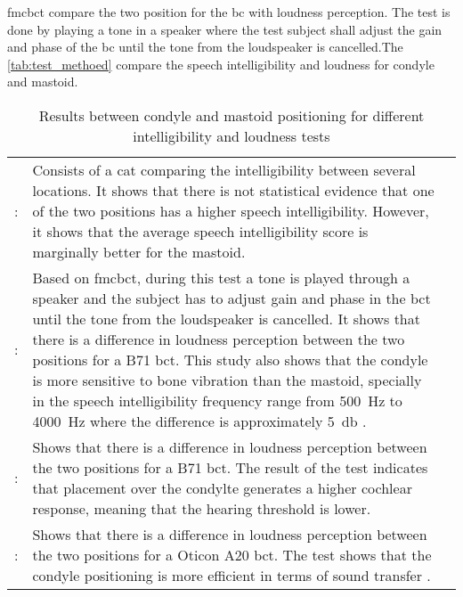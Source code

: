\gls{fmcbct} \citep{freefield_method} compare the two position for the \gls{bc} with loudness perception. The test is done by playing a tone in a speaker where the test subject shall adjust the gain and phase of the \gls{bc} until the tone from the loudspeaker is cancelled.The \autoref{tab:test_methoed} compare the speech intelligibility and loudness for condyle and mastoid.
 
\begin{table}[H]
\caption{Results between condyle and mastoid positioning for different intelligibility and loudness tests} 
\begin{tabularx}{\textwidth}{l X l}
\hline
\citep{cat_test}: & Consists of a \gls{cat} comparing the intelligibility between several locations. It shows that there is not statistical evidence that one of the two positions has a higher speech intelligibility. However, it shows that the average speech intelligibility score is marginally better for the mastoid. \\
\citep{freefield_method}: & Based on \gls{fmcbct}, during this test a tone is played through a speaker and the subject has to adjust gain and phase in the \gls{bct} until the tone from the loudspeaker is cancelled. It shows that there is a difference in loudness perception between the two positions for a B71 \gls{bct}. This study also shows that the condyle is more sensitive to bone vibration than the mastoid, specially in the speech intelligibility frequency range from \SI{500}{\hertz} to \SI{4000}{\hertz} where the difference is approximately \SI{5}{\decibel} \citep{freefield_method}. \\
\citep{Influence_without}: & Shows that there is a difference in loudness perception between the two positions for a B71 \gls{bct}. The result of the test indicates that placement over the condylte generates a higher cochlear response, meaning that the hearing threshold is lower.\\
\citep{sensitivity_mapping}: & Shows that there is a difference in loudness perception between the two positions for a Oticon A20 \gls{bct}. The test shows that the condyle positioning is more efficient  in terms of sound transfer . \\ \hline
\end{tabularx}
\label{tab:test_methoed}
\end{table}



